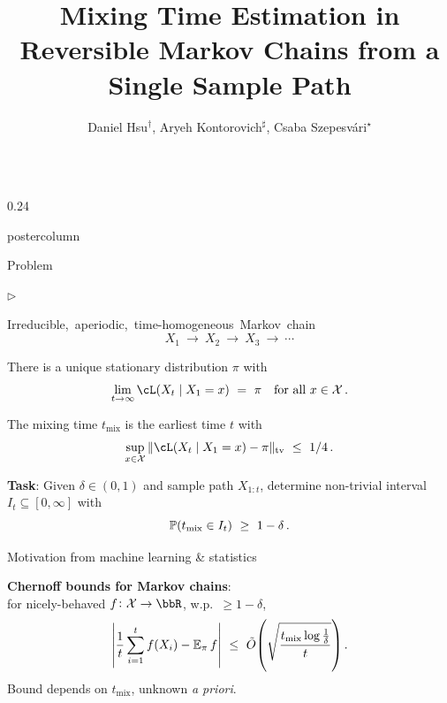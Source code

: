 \documentclass[notheorems,final]{beamer}
\title{Mixing Time Estimation in Reversible Markov Chains from a Single Sample Path}
\author{%
  Daniel Hsu$^\dag$,
  Aryeh Kontorovich$^\sharp$,
  Csaba Szepesv\'ari$^\star$%
}
\institute{%
  $^\dag$Columbia University,
  $^\sharp$Ben-Gurion University,
  $^\star$University of Alberta%
}
\newcommand{\compresslist}{%
  \setlength{\itemsep}{1pt}%
  \setlength{\parskip}{0pt}%
  \setlength{\parsep}{0pt}%
  \setlength{\leftmargin}{0.7cm}%
}
\newlength{\columnheight}
\newcommand{\GREEN}[1]{\textcolor{boldgreen}{#1}}
\newcommand{\AWESOME}[1]{\textcolor{awesome}{#1}}
\newcommand\tv{\ensuremath{\operatorname{tv}}}
\newcommand\tmix{\ensuremath{t_{\operatorname{mix}}}}
\newcommand\states{\ensuremath{\mathcal{X}}}
\begin{document}
  \begin{frame}{} 
    \vfill
    \begin{columns}
      \begin{column}{0.24\textwidth}
        \begin{beamercolorbox}[center,wd=\textwidth]{postercolumn}
          \begin{minipage}[T]{.95\textwidth}
            \parbox[t][\columnheight]{\textwidth}{
              \begin{block}{Problem}
                \begin{list}{$\triangleright$}\compresslist
                  \item
                    \mbox{Irreducible, aperiodic, time-homogeneous Markov chain}
                    \[
                      X_1 \ \to \ X_2 \ \to \ X_3 \ \to \ \dotsb
                    \]

                  \item
                    There is a unique \GREEN{stationary distribution} $\pi$ with
                    \[
                      \lim_{t\to\infty}
                      \cL(X_t \mid X_1=x) \ = \ \pi
                      \quad \text{for all $x \in \states$}
                      \,.
                    \]

                  \item
                    The \GREEN{mixing time} $\tmix$ is the earliest time $t$ with
                    \[
                      \sup_{x \in \states}
                      \norm{\cL(X_t \mid X_1=x) - \pi}_{\tv}
                      \ \leq \
                      1/4
                      \,.
                    \]
                \end{list}

                \begin{center}
                  \textbf{Task}:
                  Given $\delta \in (0,1)$ and sample path $X_{1:t}$,
                  determine non-trivial interval $I_t \subseteq
                  [0,\infty]$ with
                  \[
                    \P(\tmix \in I_t) \ \geq \ 1-\delta
                    \,.
                  \]
                \end{center}
              \end{block}

              \begin{block}{Motivation from machine learning \& statistics}

                \textbf{Chernoff bounds for Markov chains}:
                \\
                for nicely-behaved $f \colon \states \to \bbR$,
                w.p.~${\geq}1-\delta$,
                \[
                  \Abs{
                    \frac1t\sum_{i=1}^t f(X_i)
                    -
                    \E_\pi f
                  }
                  \ \leq \
                  \tilde O\Parens{
                    \sqrt{
                      \frac{\tmix \log\frac1\delta}{t}
                    }
                  }
                  \,.
                \]
                \AWESOME{Bound depends on $\tmix$, unknown \emph{a priori}}.


\end{block}}
\end{minipage}
\end{beamercolorbox}
\end{column}
\end{columns}
\end{frame}
\end{document}
